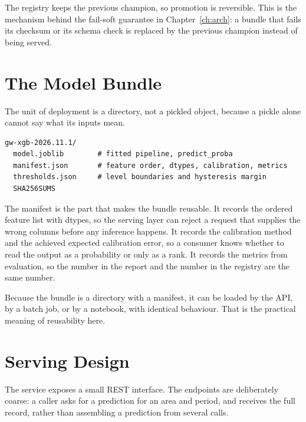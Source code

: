 \documentclass[10pt,openany]{report}
\begin{document}
The registry keeps the previous champion, so promotion is reversible. This is the mechanism
behind the fail-soft guarantee in Chapter~\ref{ch:arch}: a bundle that fails its checksum or its
schema check is replaced by the previous champion instead of being served.

\section{The Model Bundle}

The unit of deployment is a directory, not a pickled object, because a pickle alone cannot say
what its inputs mean.

\begin{verbatim}
gw-xgb-2026.11.1/
  model.joblib        # fitted pipeline, predict_proba
  manifest.json       # feature order, dtypes, calibration, metrics
  thresholds.json     # level boundaries and hysteresis margin
  SHA256SUMS
\end{verbatim}

The manifest is the part that makes the bundle reusable. It records the ordered feature list with
dtypes, so the serving layer can reject a request that supplies the wrong columns before any
inference happens. It records the calibration method and the achieved expected calibration error,
so a consumer knows whether to read the output as a probability or only as a rank. It records the
metrics from evaluation, so the number in the report and the number in the registry are the same
number.

Because the bundle is a directory with a manifest, it can be loaded by the API, by a batch job, or
by a notebook, with identical behaviour. That is the practical meaning of reusability here.

\section{Serving Design}

The service exposes a small REST interface. The endpoints are deliberately coarse: a caller asks
for a prediction for an area and period, and receives the full record, rather than assembling a
prediction from several calls.
\end{document}
